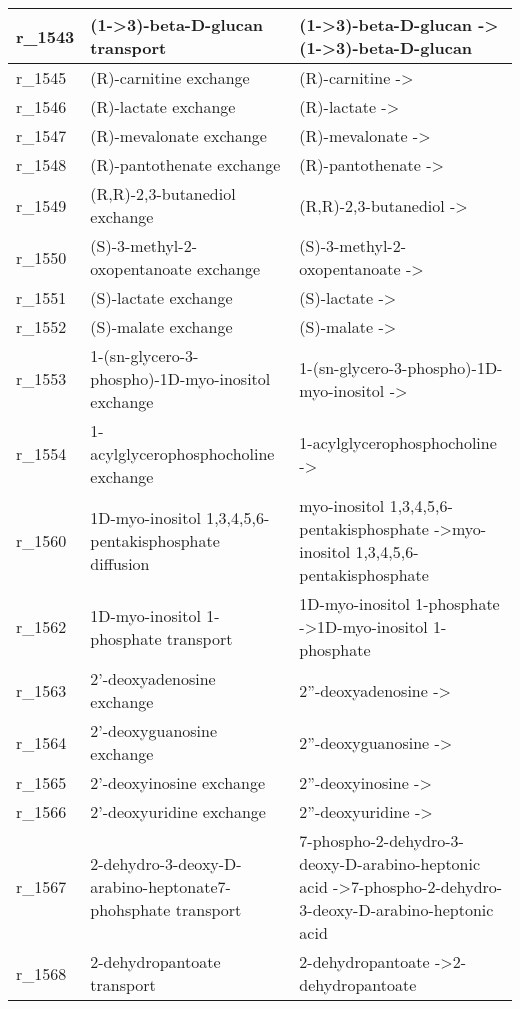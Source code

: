 \begin{landscape}
{\begin{longtable}{|l|p{7cm}|p{15cm}|}
r\_1543 & (1-\textgreater{}3)-beta-D-glucan transport & (1-\textgreater{}3)-beta-D-glucan  -\textgreater (1-\textgreater{}3)-beta-D-glucan \\ \hline
r\_1545 & (R)-carnitine exchange & (R)-carnitine  -\textgreater{} \\ \hline
r\_1546 & (R)-lactate exchange & (R)-lactate  -\textgreater{} \\ \hline
r\_1547 & (R)-mevalonate exchange & (R)-mevalonate  -\textgreater{} \\ \hline
r\_1548 & (R)-pantothenate exchange & (R)-pantothenate  -\textgreater{} \\ \hline
r\_1549 & (R,R)-2,3-butanediol exchange & (R,R)-2,3-butanediol  -\textgreater{} \\ \hline
r\_1550 & (S)-3-methyl-2-oxopentanoate exchange & (S)-3-methyl-2-oxopentanoate  -\textgreater{} \\ \hline
r\_1551 & (S)-lactate exchange & (S)-lactate  -\textgreater{} \\ \hline
r\_1552 & (S)-malate exchange & (S)-malate  -\textgreater{} \\ \hline
r\_1553 & 1-(sn-glycero-3-phospho)-1D-myo-inositol exchange & 1-(sn-glycero-3-phospho)-1D-myo-inositol  -\textgreater{} \\ \hline
r\_1554 & 1-acylglycerophosphocholine exchange & 1-acylglycerophosphocholine  -\textgreater{} \\ \hline
r\_1560 & 1D-myo-inositol 1,3,4,5,6-pentakisphosphate diffusion & myo-inositol 1,3,4,5,6-pentakisphosphate  -\textgreater myo-inositol 1,3,4,5,6-pentakisphosphate \\ \hline
r\_1562 & 1D-myo-inositol 1-phosphate transport & 1D-myo-inositol 1-phosphate  -\textgreater 1D-myo-inositol 1-phosphate \\ \hline
r\_1563 & 2'-deoxyadenosine exchange & 2''-deoxyadenosine  -\textgreater{} \\ \hline
r\_1564 & 2'-deoxyguanosine exchange & 2''-deoxyguanosine  -\textgreater{} \\ \hline
r\_1565 & 2'-deoxyinosine exchange & 2''-deoxyinosine  -\textgreater{} \\ \hline
r\_1566 & 2'-deoxyuridine exchange & 2''-deoxyuridine  -\textgreater{} \\ \hline
r\_1567 & 2-dehydro-3-deoxy-D-arabino-heptonate7-phohsphate transport & 7-phospho-2-dehydro-3-deoxy-D-arabino-heptonic acid  -\textgreater 7-phospho-2-dehydro-3-deoxy-D-arabino-heptonic acid \\ \hline
r\_1568 & 2-dehydropantoate transport & 2-dehydropantoate  -\textgreater 2-dehydropantoate \\ \hline

\end{longtable}}
\end{landscape}
